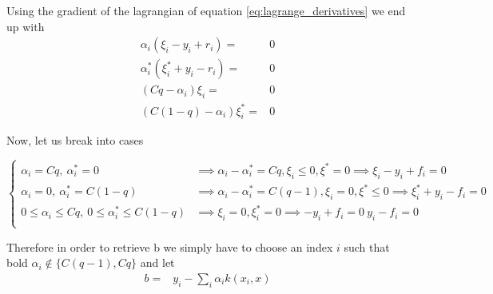 Using the gradient of the lagrangian of equation \ref{eq:lagrange_derivatives} we end up with
\begin{equation}
    \begin{aligned}
        \alpha_i(\xi_i-y_i+r_i)=&0
        \\
        \alpha_i^*(\xi_i^*+y_i-r_i)=&0
        \\
        (Cq-\alpha_i) \xi_i=&0
        \\
        (C(1-q)-\alpha_i) \xi_i^*=&0
    \end{aligned}
\end{equation}

Now, let us break into cases

\begin{equation}
\begin{cases}
    \alpha_i=Cq, \ \alpha_i^*=0 & \implies \alpha_i-\alpha_i^*=Cq, \xi_i\leq 0, \xi^*=0\implies \xi_i-y_i+f_i=0 \\
    \alpha_i=0, \ \alpha_i^*=C(1-q) & \implies \alpha_i-\alpha_i^*=C(q-1), \xi_i= 0, \xi^*\leq 0 \implies \xi_i^*+y_i-f_i=0 \\
    0\leq \alpha_i\leq Cq, \ 0\leq \alpha_i^*\leq C(1-q) & \implies \xi_i=0,  \xi^*_i= 0 \implies -y_i+f_i=0 \ y_i-f_i=0 \\
\end{cases}
\end{equation}

Therefore in order to retrieve b we simply have to choose an index $i$ such that bold $\alpha_i \not \in \{C(q-1), Cq\}$
and let
\begin{equation}
    \begin{aligned}
    b=&y_i-\sum_i \alpha_i k(x_i,x)
    \end{aligned}
\end{equation}


